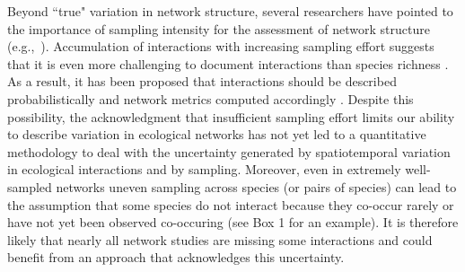 \documentclass[12pt]{article}
\begin{document}
    Beyond ``true" variation in network structure, several researchers have pointed to the importance of sampling intensity for the assessment of network structure (e.g.,~\citealp{Martinez1999,Bluthgen2006,Bluthgen2007}). Accumulation of interactions with increasing sampling effort suggests that it is even more challenging to document interactions than species richness \citep{Poisot2012}. As a result, it has been proposed that interactions should be described probabilistically and network metrics computed accordingly \citep{Poisot2016}. Despite this possibility, the acknowledgment that insufficient sampling effort limits our ability to describe variation in ecological networks has not yet led to a quantitative methodology to deal with the uncertainty generated by spatiotemporal variation in ecological interactions and by sampling. Moreover, even in extremely well-sampled networks uneven sampling across species (or pairs of species) can lead to the assumption that some species do not interact because they co-occur rarely or have not yet been observed co-occuring (see Box 1 for an example). It is therefore likely that nearly all network studies are missing some interactions and could benefit from an approach that acknowledges this uncertainty.
\end{document}
